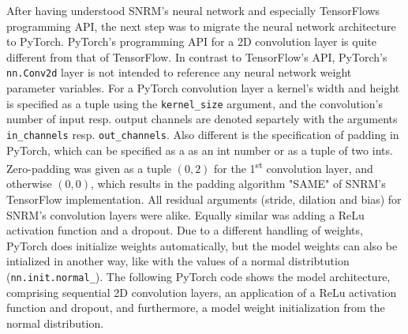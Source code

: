After having understood SNRM's neural network and especially TensorFlows programming API,
    the next step was to migrate the neural network architecture to PyTorch.
PyTorch's programming API for a 2D convolution layer is quite different from that of TensorFlow.
In contrast to TensorFlow's API, PyTorch's \texttt{nn.Conv2d} layer
    is not intended to reference any neural network weight parameter variables.
For a PyTorch convolution layer a kernel's width and height is specified as a tuple
    using the \texttt{kernel\_size} argument, and the convolution's number of input resp. output channels
    are denoted separtely with the arguments \texttt{in\_channels} resp. \texttt{out\_channels}.
Also different is the specification of padding in PyTorch, which can be specified as a as an int number or
    as a tuple of two ints.
Zero-padding was given as a tuple $(0, 2)$ for the 1\textsuperscript{st} convolution layer,
    and otherwise $(0, 0)$, which results in the padding algorithm "SAME" of SNRM's TensorFlow implementation.
All residual arguments (stride, dilation and bias) for SNRM's convolution layers were alike.
Equally similar was adding a ReLu activation function and a dropout.
Due to a different handling of weights, PyTorch does initialize weights automatically, 
    but the model weights can also be intialized in another way, like with the values of a 
    normal distribtution (\texttt{nn.init.normal\_}).
The following PyTorch code shows the model architecture, comprising sequential 
    2D convolution layers, an application of a ReLu activation function and dropout,
    and furthermore, a model weight initialization from the normal distribution.

